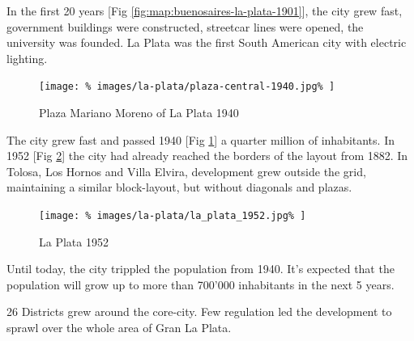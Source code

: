 \documentclass{article}
\begin{document}
\begin{multicols}{2}
			
			
			In the first 20 years [Fig \ref{fig:map:buenosaires-la-plata-1901}], the city grew fast, government buildings were constructed, streetcar lines were opened, the university was founded. La Plata was the first South American city with electric lighting.
			
			
			
			
			\begin{figure}[H]
				\texttt{[image: \%
					images/la-plata/plaza-central-1940.jpg\%
				]}
				\caption{Plaza Mariano Moreno of La Plata 1940  \cite{Blogspot:Arqruotolo:la-plata-o-la-geometria-hecha-espacio}}
				\label{fig:img:la-plata-1940}
			\end{figure}
			
			The city grew fast and passed 1940 [Fig \ref{fig:img:la-plata-1940}] a quarter million of inhabitants.
			In 1952 [Fig \ref{fig:map:la-plata-1952}] the city had already reached the borders of the layout from 1882. In Tolosa, Los Hornos and Villa Elvira, development grew outside the grid, maintaining a similar block-layout, but without diagonals and plazas.
			
			\begin{figure}[H]
				\texttt{[image: \%
					images/la-plata/la\_plata\_1952.jpg\%
				]}
				\caption{La Plata 1952 \cite{MOSP:InvestigacionHistorica}}
				\label{fig:map:la-plata-1952}
			\end{figure}
			
			
			Until today, the city trippled the population from 1940.
			It's expected that the population will grow up to more than 700'000 inhabitants in the next 5 years.
			
			
			
			26 Districts grew around the core-city. Few regulation led the development to sprawl over the whole area of Gran La Plata.
			

\end{multicols}
\end{document}
